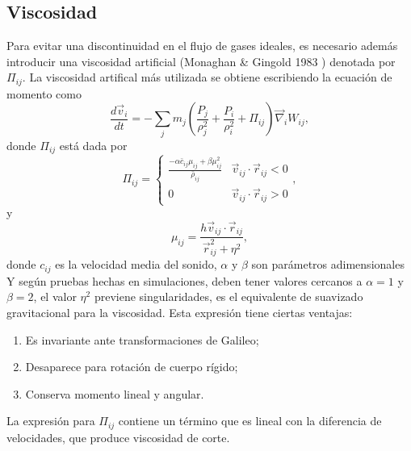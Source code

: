 \documentclass[a4paper,openright,10pt, oneside, final]{book}
\begin{document}
\subsection{Viscosidad}
Para evitar una discontinuidad en el flujo de gases ideales, es necesario además introducir una viscosidad artificial (Monaghan \& Gingold 1983 \cite{b9.2}) denotada por $\Pi_{ij}$. La viscosidad artifical más utilizada se obtiene escribiendo la ecuación de momento como
\begin{equation}
\frac{d \vec{v}_{i}}{d t}
=
- \sum_{j} m_{j} 
\left(\frac{P_{j}}{\rho_{j}^{2}}+ \frac{P_{i}}{\rho_{i}^{2}} + \Pi_{ij}\right)
\vec{\nabla}_{i}W_{ij}, \label{eqn 2.40}
\end{equation}
donde $\Pi_{ij}$ está dada por
\begin{equation}
\Pi_{ij} = \left\lbrace
\begin{array}{ll}
\frac{-\alpha \bar{c}_{ij}\mu_{ij}+\beta\mu_{ij}^{2}}{\bar{\rho}_{ij}}  & \vec{v}_{ij}\cdot\vec{r}_{ij} < 0\\

0  & \vec{v}_{ij}\cdot\vec{r}_{ij} > 0
\end{array}
\right.,\label{eqn 2.41}
\end{equation}
y 
\begin{equation}
\mu_{ij}=\frac{h\vec{v}_{ij}\cdot\vec{r}_{ij}}{\vec{r}_{ij}^{2}+\eta^{2}},\label{eqn 2.42}
\end{equation}
donde $c_{ij}$ es la velocidad media del sonido, $\alpha$ y $\beta$ son parámetros adimensionales Y según pruebas hechas en simulaciones, deben tener valores cercanos a $\alpha=1$ y $\beta=2$, el valor $\eta^{2}$ previene singularidades, es el equivalente de suavizado gravitacional para la viscosidad. Esta expresión tiene ciertas ventajas:
\begin{enumerate}
\item Es invariante ante transformaciones de Galileo;
\item Desaparece para rotación de cuerpo rígido;
\item Conserva momento lineal y angular.
\end{enumerate}
La expresión para $\Pi_{ij}$ contiene un término que es lineal con la diferencia de velocidades, que produce viscosidad de corte.
\end{document}
